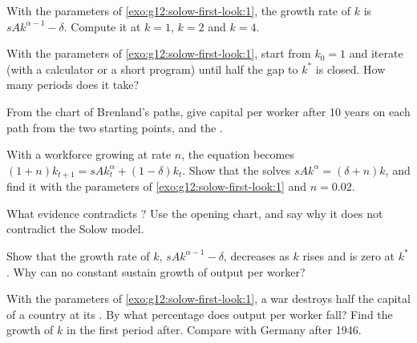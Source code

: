 \begin{exercise}[$\star\star$]\label{exo:g12:solow-first-look:8}
With the parameters of \cref{exo:g12:solow-first-look:1}, the growth rate of $k$ is $sAk^{\alpha - 1} - \delta$. Compute it at $k = 1$, $k = 2$ and $k = 4$.
\end{exercise}

\begin{exercise}[$\star\star$]\label{exo:g12:solow-first-look:9}
With the parameters of \cref{exo:g12:solow-first-look:1}, start from $k_0 = 1$ and iterate (with a calculator or a short program) until half the gap to $k^*$ is closed.
How many periods does it take?
\end{exercise}

\begin{exercise}[$\star\star$]\label{exo:g12:solow-first-look:10}
From the chart of Brenland's paths, give capital per worker after 10 years on each path from the two starting points, and the .
\end{exercise}

\begin{exercise}[$\star\star$]\label{exo:g12:solow-first-look:11}
With a workforce growing at rate $n$, the equation becomes $(1 + n)k_{t+1} = sAk_t^{\alpha} + (1 - \delta)k_t$. Show that the  solves $sAk^{\alpha} = (\delta + n)k$,
and find it with the parameters of \cref{exo:g12:solow-first-look:1} and $n = 0.02$.
\end{exercise}

\begin{exercise}[$\star\star\star$]\label{exo:g12:solow-first-look:12}
What evidence contradicts ? Use the opening chart, and say why it does not contradict the Solow model.
\end{exercise}

\begin{exercise}[$\star\star\star$]\label{exo:g12:solow-first-look:13}
Show that the growth rate of $k$, $sAk^{\alpha - 1} - \delta$, decreases as $k$ rises and is zero at $k^*$. Why can no constant  sustain growth of output per worker?
\end{exercise}

\begin{exercise}[$\star\star\star$]\label{exo:g12:solow-first-look:14}
With the parameters of \cref{exo:g12:solow-first-look:1}, a war destroys half the capital of a country at its . By what percentage does output per worker fall?
Find the growth of $k$ in the first period after. Compare with Germany after 1946.
\end{exercise}

